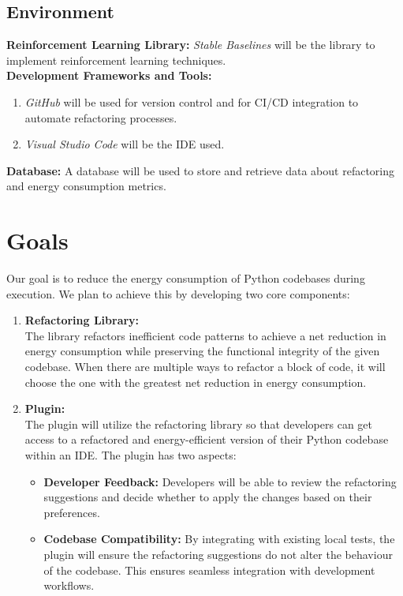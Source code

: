 \documentclass{article}
\begin{document}
\subsection{Environment}
\textbf{Reinforcement Learning Library:} \textit{Stable Baselines}
will be the library to implement reinforcement learning techniques.\\
\textbf{Development Frameworks and Tools:}
\begin{enumerate}

  \item \textit{GitHub} will be used for version control and for
    CI/CD integration to automate refactoring processes.
  \item \textit{Visual Studio Code} will be the IDE used.

\end{enumerate}
\textbf{Database:} A database will be used to store and retrieve data
about refactoring and energy consumption metrics.

\section{Goals}

Our goal is to reduce the energy consumption of Python codebases
during execution. We plan to achieve this by developing two core components:

\begin{enumerate}
  \item \textbf{Refactoring Library:} \\
    The library refactors inefficient code patterns to achieve a net
    reduction in energy consumption while preserving the functional
    integrity of the given codebase. When there are multiple ways to
    refactor a block of code, it will choose the one with the
    greatest net reduction in energy consumption.

  \item \textbf{Plugin:} \\
    The plugin will utilize the refactoring library so that
    developers can get access to a refactored and energy-efficient
    version of their Python codebase within an IDE. The plugin has two aspects:

    \begin{itemize}
      \item \textbf{Developer Feedback:} Developers will be able to
        review the refactoring suggestions and decide whether to
        apply the changes based on their preferences.
      \item \textbf{Codebase Compatibility:} By integrating with
        existing local tests, the plugin will ensure the refactoring
        suggestions do not alter the behaviour of the codebase. This
        ensures seamless integration with development workflows.
    \end{itemize}
\end{enumerate}
\end{document}
